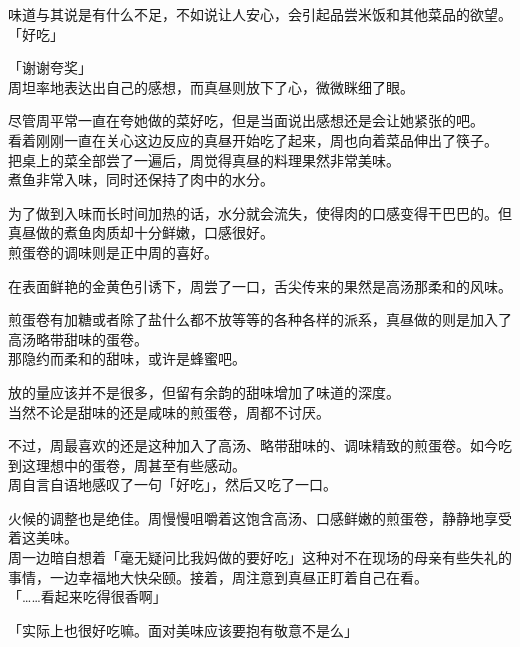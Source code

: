 味道与其说是有什么不足，不如说让人安心，会引起品尝米饭和其他菜品的欲望。\\

「好吃」

「谢谢夸奖」\\

周坦率地表达出自己的感想，而真昼则放下了心，微微眯细了眼。

尽管周平常一直在夸她做的菜好吃，但是当面说出感想还是会让她紧张的吧。\\

看着刚刚一直在关心这边反应的真昼开始吃了起来，周也向着菜品伸出了筷子。\\

把桌上的菜全部尝了一遍后，周觉得真昼的料理果然非常美味。\\

煮鱼非常入味，同时还保持了肉中的水分。

为了做到入味而长时间加热的话，水分就会流失，使得肉的口感变得干巴巴的。但真昼做的煮鱼肉质却十分鲜嫩，口感很好。\\

煎蛋卷的调味则是正中周的喜好。

在表面鲜艳的金黄色引诱下，周尝了一口，舌尖传来的果然是高汤那柔和的风味。

煎蛋卷有加糖或者除了盐什么都不放等等的各种各样的派系，真昼做的则是加入了高汤略带甜味的蛋卷。\\

那隐约而柔和的甜味，或许是蜂蜜吧。

放的量应该并不是很多，但留有余韵的甜味增加了味道的深度。\\

当然不论是甜味的还是咸味的煎蛋卷，周都不讨厌。

不过，周最喜欢的还是这种加入了高汤、略带甜味的、调味精致的煎蛋卷。如今吃到这理想中的蛋卷，周甚至有些感动。\\

周自言自语地感叹了一句「好吃」，然后又吃了一口。

火候的调整也是绝佳。周慢慢咀嚼着这饱含高汤、口感鲜嫩的煎蛋卷，静静地享受着这美味。\\

周一边暗自想着「毫无疑问比我妈做的要好吃」这种对不在现场的母亲有些失礼的事情，一边幸福地大快朵颐。接着，周注意到真昼正盯着自己在看。\\

「……看起来吃得很香啊」

「实际上也很好吃嘛。面对美味应该要抱有敬意不是么」

